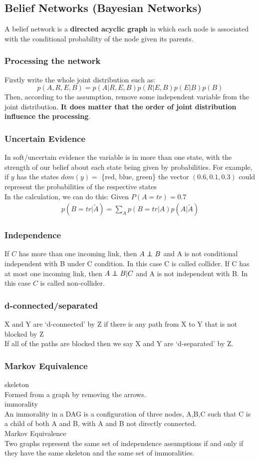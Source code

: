 \documentclass[12pt,a4paper]{article}
\newcommand\independent{\protect\mathpalette{\protect\independenT}{\perp}}
\def\independenT#1#2{\mathrel{\rlap{$#1#2$}\mkern2mu{#1#2}}}
\begin{document}
\subsection*{Belief Networks (Bayesian Networks)}
A belief network is a \textbf{directed acyclic graph} in which each node is associated with the conditional probability of the node given its parents.
\subsubsection*{Processing the network}
Firstly write the whole joint distribution such as:
$$
p(A,R,E,B) = p(A|R,E,B)p(R|E,B)p(E|B)p(B)
$$
Then, according to the assumption, remove some independent variable from the joint distribution. \textbf{It does matter that the order of joint distribution influence the processing}.
\subsubsection*{Uncertain Evidence}
In soft/uncertain evidence the variable is in more than one state, with the strength of our belief about each state being given by probabilities. For example, if $y$ has the states $dom(y) =$ \{red, blue, green\} the vector $(0.6, 0.1, 0.3)$ could represent the probabilities of the respective states\\
In the calculation, we can do this: Given $P(A=tr)=0.7$ 
\begin{eqnarray*}
p(B=tr|\widetilde{A}) = \sum_{A}p(B=tr|A)p(A|\widetilde{A}) 
\end{eqnarray*}
\subsubsection*{Independence}
If $C$ has more than one incoming link, then $A\independent B$ and A is not conditional independent with B under C condition. In this case C is called collider.
If C has at most one incoming link, then $A \independent B|C$ and A is not independent with B. In this case $C$ is called non-collider.
\subsubsection*{d-connected/separated}
X and Y are ‘d-connected’ by Z if there is any path from X to Y that is not blocked by Z\\
If all of the paths are blocked then we say X and Y are ‘d-separated’ by Z.
\subsubsection*{Markov Equivalence}
{\large skeleton}\\
Formed from a graph by removing the arrows.\\
{\large immorality}\\
An immorality in a DAG is a configuration of three nodes, A,B,C such that C is a child of both A and B, with A and B not directly connected.\\
{\large Markov Equivalence}\\
Two graphs represent the same set of independence assumptions if and only if they have the same skeleton and the same set of immoralities.\\
\end{document}
